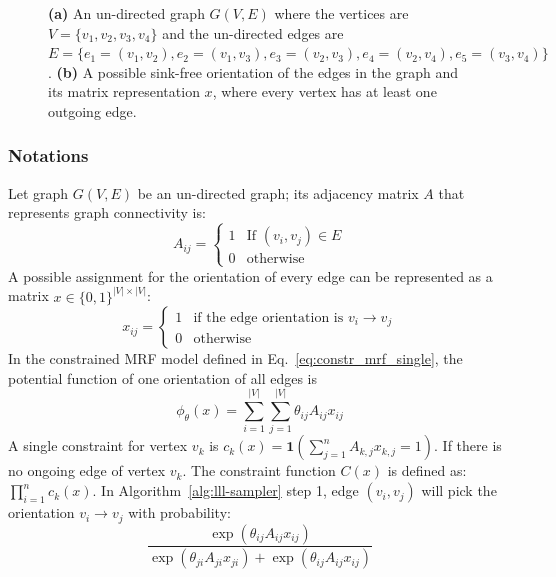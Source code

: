 \begin{figure}[t]
\caption{{\textbf{(a)} An un-directed graph $G(V,E)$ where the vertices are $V=\{v_1,v_2,v_3,v_4\}$ and the un-directed edges are $E=\{e_1=(v_1,v_2),e_2=(v_1,v_3),e_3=(v_2,v_3),e_4=(v_2,v_4),e_5=(v_3,v_4)\}$. \textbf{(b)} A possible sink-free orientation of the edges in the graph and its matrix representation $x$, where every vertex has at least one outgoing edge. }}
\label{fig:sinkfreeex}
\end{figure}

\subsubsection{Notations} Let  graph $G(V,E)$ be an  un-directed graph; its
 adjacency matrix $A$ that represents graph connectivity is:
\begin{equation}\label{eq:adjacency}
A_{ij}=\begin{cases}
{1}&\text{If } (v_i,v_j)\in E\\
0&\text{otherwise}
\end{cases}
\end{equation}
A possible assignment for the orientation of every edge can be represented as a matrix $x\in\{0,1\}^{|V|\times |V|}$:
\begin{equation}\label{eq:orientation-assign}
x_{ij}=\begin{cases}
1& \text{if the edge orientation is } v_i\to v_j \\
0&\text{otherwise}
\end{cases}
\end{equation}
In the constrained MRF model defined in Eq.~\eqref{eq:constr_mrf_single}, the potential function of one orientation of all edges is
\begin{equation*}
 \phi_{\theta}(x)=\sum_{i=1}^{|V|}\sum_{j=1}^{|V|}\theta_{ij}A_{ij}x_{ij}
\end{equation*}
A single constraint for vertex $v_k$ is $c_k(x)=\mathbf{1}\left(\sum_{j=1}^nA_{k,j}x_{k,j}=1\right)$. If there is no ongoing edge of vertex $v_k$. The  constraint function $C(x)$ is defined as: $\prod_{i=1}^nc_k(x)$. In Algorithm~\ref{alg:lll-sampler} step 1, edge $(v_i,v_j)$ will pick the orientation $v_i\to v_j$  with probability:
\begin{equation*}
\frac{\exp(\theta_{ij}A_{ij}x_{ij})}{\exp(\theta_{ji}A_{ji}x_{ji})+\exp(\theta_{ij}A_{ij}x_{ij})}
\end{equation*}


